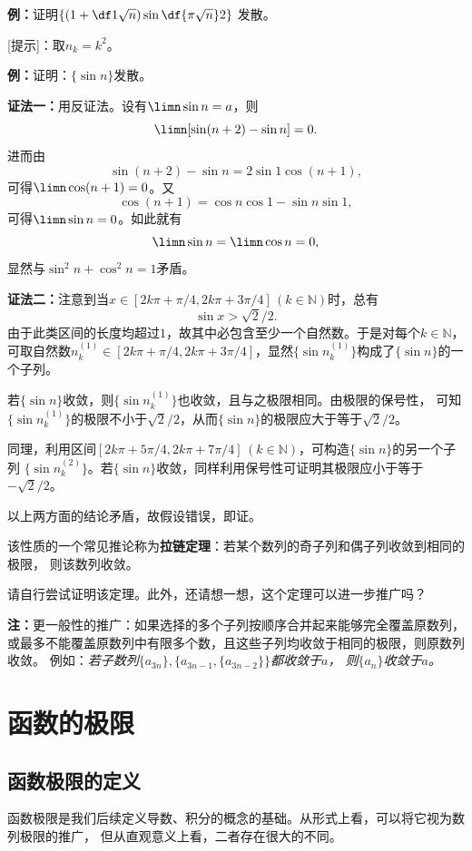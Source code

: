 {\bf 例：}证明$\left\{\left(1+\df1{\sqrt n}\right)\sin\df{\pi\sqrt n}2\right\}$
发散。

[提示]：取$n_k=k^2$。 

\begin{shaded}
	{\bf 例：}证明：$\{\sin n\}$发散。
	
	{\bf 证法一：}用反证法。设有$\limn\sin n=a$，则
	$$\limn[\sin(n+2)-\sin n]=0.$$
	进而由
	$$\sin(n+2)-\sin n=2\sin 1\cos(n+1),$$
	可得$\limn\cos(n+1)=0$。又
	$$\cos(n+1)=\cos n\cos 1-\sin n\sin 1,$$
	可得$\limn\sin n=0$。如此就有
	$$\limn\sin n=\limn\cos n=0,$$
	显然与$\sin^2n+\cos^2n=1$矛盾。
	
	{\bf 证法二：}注意到当$x\in[2k\pi+\pi/4,2k\pi+3\pi/4]\,(k\in\mathbb{N})$时，总有
	$$\sin x>\sqrt2/2.$$
	由于此类区间的长度均超过$1$，故其中必包含至少一个自然数。于是对每个$k\in\mathbb{N}$，
	可取自然数$n^{(1)}_k\in[2k\pi+\pi/4,2k\pi+3\pi/4]$，显然$\{\sin{n^{(1)}_k}\}$构成了$\{\sin
	n\}$的一个子列。
	
	若$\{\sin n\}$收敛，则$\{\sin{n^{(1)}_k}\}$也收敛，且与之极限相同。由极限的保号性，
	可知$\{\sin{n^{(1)}_k}\}$的极限不小于$\sqrt2/2$，从而$\{\sin
	n\}$的极限应大于等于$\sqrt2/2$。
	
	同理，利用区间$[2k\pi+5\pi/4,2k\pi+7\pi/4]\,(k\in\mathbb{N})$，可构造$\{\sin
	n\}$的另一个子列 $\{\sin{n^{(2)}_k}\}$。若$\{\sin n\}$收敛，同样利用保号性可证明其极限应小于等于$-\sqrt2/2$。
	
	
	以上两方面的结论矛盾，故假设错误，即证。
\end{shaded}

该性质的一个常见推论称为{\bf 拉链定理}：若某个数列的奇子列和偶子列收敛到相同的极限，
则该数列收敛。

请自行尝试证明该定理。此外，还请想一想，这个定理可以进一步推广吗？

{\bf 注：}更一般性的推广：如果选择的多个子列按顺序合并起来能够完全覆盖原数列，
或最多不能覆盖原数列中有限多个数，且这些子列均收敛于相同的极限，则原数列收敛。
例如：{\it 若子数列$\{a_{3n}\},\{a_{3n-1},\{a_{3n-2}\}\}$都收敛于$a$，
则$\{a_{n}\}$收敛于$a$。}

\section{函数的极限}

\subsection{函数极限的定义}

函数极限是我们后续定义导数、积分的概念的基础。从形式上看，可以将它视为数列极限的推广，
但从直观意义上看，二者存在很大的不同。

